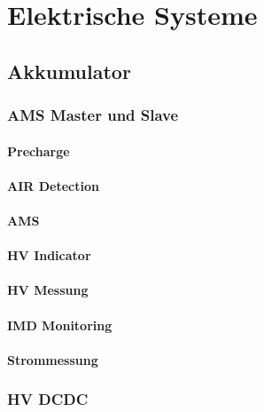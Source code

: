
\chapter{Elektrische Systeme}

\section{Akkumulator}

\subsection{AMS Master und Slave}

\subsubsection{Precharge}

\subsubsection{AIR Detection}

\subsubsection{AMS}

\subsubsection{HV Indicator}

\subsubsection{HV Messung}

\subsubsection{IMD Monitoring}

\subsubsection{Strommessung}

\subsection{HV DCDC}

